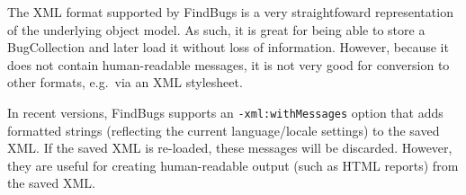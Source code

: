 \documentclass[11pt]{article}
\begin{document}
The XML format supported by FindBugs is a very straightfoward representation of
the underlying object model.  As such, it is great for being able to store
a BugCollection and later load it without loss of information.  However,
because it does not contain human-readable messages, it is not very good
for conversion to other formats, e.g.\ via an XML stylesheet.

In recent versions, FindBugs supports an {\tt -xml:withMessages}
option that adds formatted strings (reflecting the current language/locale
settings) to the saved XML.  If the saved XML is re-loaded, these
messages will be discarded.  However, they are useful for creating
human-readable output (such as HTML reports) from the saved XML.
\end{document}
